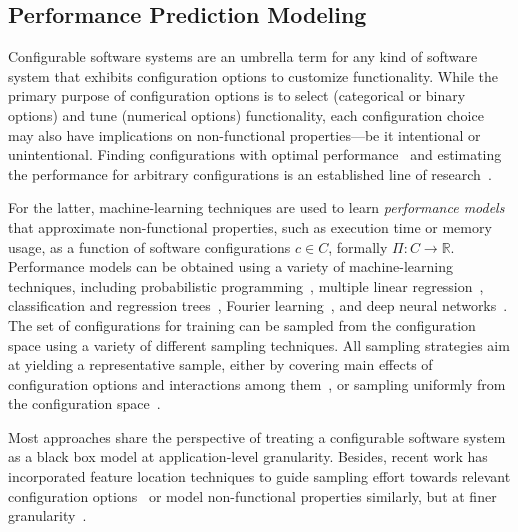 \subsection{Performance Prediction Modeling}
Configurable software systems are an umbrella term for any kind of software system that exhibits configuration options to customize functionality. 
While the primary purpose of configuration options is to select (categorical or binary options) and tune (numerical options) functionality, each configuration choice may also have implications on non-functional properties---be it intentional or unintentional. Finding configurations with optimal performance~\cite{nairUsingBadLearners2017,nairFlash18,ohFindingNearoptimalConfigurations2017} and estimating the performance for arbitrary configurations is an established line of research~\cite{siegmundPerformanceinfluenceModelsHighly2015,haDeepPerf2019,perfAL,guoVariabilityawarePerformancePrediction2013,sarkarCostEfficientSamplingPerformance,guo_2018_data,fourier_learning_2015,perLasso}. 

For the latter, machine-learning techniques are used to learn \emph{performance models} that approximate non-functional properties, such as execution time or memory usage, as a function of software configurations $c \in C$, formally $\Pi: C \rightarrow \mathbb{R}$.
Performance models can be obtained using a variety of machine-learning techniques, including probabilistic programming~\cite{dorn2020}, multiple linear regression~\cite{siegmundPerformanceinfluenceModelsHighly2015}, classification and regression trees~\cite{sarkarCostEfficientSamplingPerformance,guo_2018_data}, Fourier learning~\cite{fourier_learning_2015,perLasso}, and deep neural networks~\cite{haDeepPerf2019,perfAL}.
The set of configurations for training can be sampled from the configuration space using a variety of different sampling techniques. All sampling strategies aim at yielding a representative sample, either by covering main effects of configuration options and interactions among them~\cite{siegmundPredictingPerformanceAutomated2012}, or sampling uniformly from the configuration space~\cite{ohFindingNearoptimalConfigurations2017,kaltenecker_distance-based_2019}.

Most approaches share the perspective of treating a configurable software system as a black box model at application-level granularity. Besides, recent work has incorporated feature location techniques to guide sampling effort towards relevant configuration options~\cite{velez_2020_configcrusher_jase,velez_comprex_2021} or model non-functional properties similarly, but at finer granularity~\cite{weber_white_2021}.

